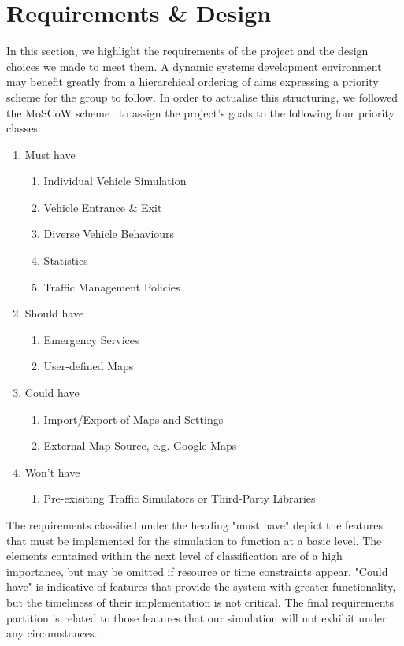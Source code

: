 \section{Requirements \& Design}\label{sec:reqs}
In this section, we highlight the requirements of the project and the design choices we made to meet them. A dynamic systems development environment may benefit greatly from a hierarchical ordering of aims expressing a priority scheme for the group to follow. In order to actualise this structuring, we followed the MoSCoW scheme~\cite{brennan2009,d2014introduction} to assign the project's goals to the following four priority classes:
\begin{enumerate} \itemsep1pt \parskip0pt 
	\item{Must have}
		\begin{enumerate} \itemsep1pt \parskip0pt 
			\item{Individual Vehicle Simulation}
			\item{Vehicle Entrance \& Exit}
			\item{Diverse Vehicle Behaviours}
			\item{Statistics}
			\item{Traffic Management Policies}
		\end{enumerate}
	\item{Should have}
		\begin{enumerate} \itemsep1pt \parskip0pt 
			\item{Emergency Services}
			\item{User-defined Maps}
		\end{enumerate}
	\item{Could have}
		\begin{enumerate} \itemsep1pt \parskip0pt 
			\item{Import/Export of Maps and Settings}
			\item{External Map Source, e.g. Google Maps}
		\end{enumerate}
	\item{Won't have}
		\begin{enumerate} \itemsep1pt \parskip0pt 
			\item{Pre-exisiting Traffic Simulators or Third-Party Libraries}
		\end{enumerate}
\end{enumerate}

The requirements classified under the heading "must have" depict the features that must be implemented for the simulation to function at a basic level. The elements contained within the next level of classification are of a high importance, but may be omitted if resource or time constraints appear. "Could have" is indicative of features that provide the system with greater functionality, but the timeliness of their implementation is not critical. The final requirements partition is related to those features that our simulation will not exhibit under any circumstances. 

